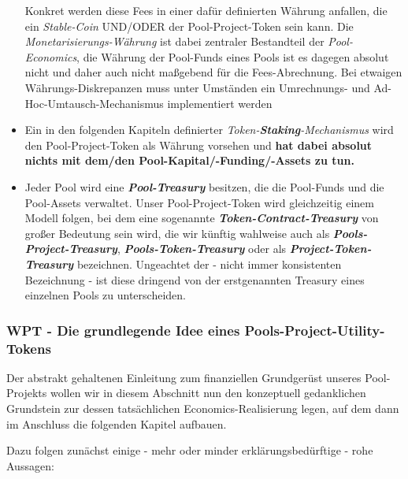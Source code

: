 \begin{Abgrenzung}
\begin{itemize}
	Konkret werden diese Fees in einer dafür definierten Währung anfallen, die ein \textit{Stable-Coin} UND/ODER der Pool-Project-Token sein kann. Die \textit{Monetarisier\-ungs-Währung} ist dabei zentraler Bestandteil der \textit{Pool-Economics}, die Währung der Pool-Funds eines Pools ist es dagegen absolut nicht und daher auch nicht maßgebend für die Fees-Abrechnung. Bei etwaigen Währungs-Diskrepanzen muss unter Umständen ein Umrechnungs- und Ad-Hoc-Umtausch-Mechanismus implementiert werden
	\item Ein in den folgenden Kapiteln definierter \textit{Token-\textbf{Staking}-Mechanismus} wird den Pool-Project-Token als Währung vorsehen und \textbf{hat dabei absolut nichts mit dem/den Pool-Kapital/-Funding/-Assets zu tun.}
	\item Jeder Pool wird eine \textbf{\textit{Pool-Treasury}} besitzen, die die Pool-Funds und die Pool-Assets verwaltet. Unser Pool-Project-Token wird gleichzeitig einem Mo\-dell folgen, bei dem eine sogenannte \textbf{\textit{Token-Contract-Treasury}} von großer Bedeutung sein wird, die wir künftig wahlweise auch als \textbf{\textit{Pools-Project-Treasury}}, \textbf{\textit{Pools-Token-Treasury}} oder als \textbf{\textit{Project-Token-Treasury}} be\-zeichnen. Ungeachtet der - nicht immer konsistenten Bezeichnung - ist diese dringend von der erstgenannten Treasury eines einzelnen Pools zu unterscheiden.
\end{itemize}

\end{Abgrenzung}

\vspace{0.5cm}



\subsubsection{WPT - Die grundlegende Idee eines Pools-Project-Utility-Tokens}
\vspace{0.2cm}

Der abstrakt gehaltenen Einleitung zum finanziellen Grundgerüst unseres Pool-Projekts wollen wir in diesem Abschnitt nun den konzeptuell gedanklichen Grundstein zur dessen tatsächlichen Economics-Realisierung legen, auf dem dann im Anschluss die folgenden Kapitel aufbauen.

\vspace{0.2cm}

Dazu folgen zunächst einige - mehr oder minder erklärungsbedürftige - rohe Aussagen: 

